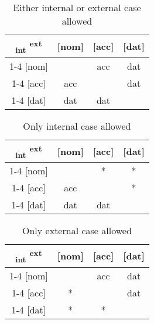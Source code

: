 \begin{table}[H]
  \center
  \caption{Either internal or external case allowed}
  \begin{tabular}{c|c|c|c}
    \toprule
    \textsubscript{\ac{int}} \textsuperscript{\ac{ext}}
           & [\ac{nom}]
           & [\ac{acc}]
           & [\ac{dat}]
           \\ \cmidrule{1-4}
       [\ac{nom}]
           & \xcancel{\phantom{xx}}
           & \ac{acc}
           & \ac{dat}
           \\ \cmidrule{1-4}
       [\ac{acc}]
           & \ac{acc}
           & \xcancel{\phantom{xx}}
           & \ac{dat}
           \\ \cmidrule{1-4}
       [\ac{dat}]
           & \ac{dat}
           & \ac{dat}
           & \xcancel{\phantom{xx}}
           \\
     \bottomrule
  \end{tabular}
    \label{tbl:case-competition-int-ext-typology}
\end{table}


\begin{table}[H]
  \center
  \caption{Only internal case allowed}
  \begin{tabular}{c|c|c|c}
    \toprule
    \textsubscript{\ac{int}} \textsuperscript{\ac{ext}}
           & [\ac{nom}]
           & [\ac{acc}]
           & [\ac{dat}]
           \\ \cmidrule{1-4}
       [\ac{nom}]
           & \xcancel{\phantom{xx}}
           & *
           & *
           \\ \cmidrule{1-4}
       [\ac{acc}]
           & \ac{acc}
           & \xcancel{\phantom{xx}}
           & *
           \\ \cmidrule{1-4}
       [\ac{dat}]
           & \ac{dat}
           & \ac{dat}
           & \xcancel{\phantom{xx}}
           \\
     \bottomrule
  \end{tabular}
    \label{tbl:case-competition-only-int-typology}
\end{table}


\begin{table}[H]
  \center
  \caption{Only external case allowed}
  \begin{tabular}{c|c|c|c}
    \toprule
    \textsubscript{\ac{int}} \textsuperscript{\ac{ext}}
           & [\ac{nom}]
           & [\ac{acc}]
           & [\ac{dat}]
           \\ \cmidrule{1-4}
       [\ac{nom}]
           & \xcancel{\phantom{xx}}
           & \ac{acc}
           & \ac{dat}
           \\ \cmidrule{1-4}
       [\ac{acc}]
           & *
           & \xcancel{\phantom{xx}}
           & \ac{dat}
           \\ \cmidrule{1-4}
       [\ac{dat}]
           & *
           & *
           & \xcancel{\phantom{xx}}
           \\
     \bottomrule
  \end{tabular}
    \label{tbl:case-competition-only-ext-typology}
\end{table}


